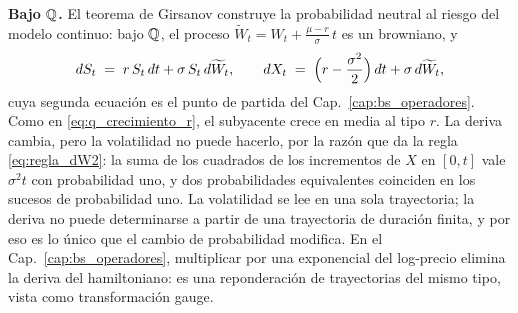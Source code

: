 \noindent\textbf{Bajo $\mathbb{Q}$.}
El teorema de Girsanov \cite[sec.~4.4]{tfgm} construye la probabilidad
neutral al riesgo del modelo continuo: bajo $\mathbb{Q}$, el proceso
$\widetilde W_t = W_t + \frac{\mu - r}{\sigma}\,t$ es un browniano, y
\begin{equation}\label{eq:bs_eds_Q}
  dS_t \;=\; r\, S_t\, dt + \sigma\, S_t\, d\widetilde W_t,
  \qquad
  dX_t \;=\; \Bigl(r - \frac{\sigma^2}{2}\Bigr)\, dt
  + \sigma\, d\widetilde W_t,
\end{equation}
cuya segunda ecuación es el punto de partida del
Cap.~\ref{cap:bs_operadores}\enprep. Como en \eqref{eq:q_crecimiento_r}, el
subyacente crece en media al tipo $r$. La deriva cambia, pero la
volatilidad no puede hacerlo, por la razón que da la regla
\eqref{eq:regla_dW2}: la suma de los cuadrados de los incrementos de $X$
en $[0, t]$ vale $\sigma^2 t$ con probabilidad uno, y dos probabilidades
equivalentes coinciden en los sucesos de probabilidad uno. La
volatilidad se lee en una sola trayectoria; la deriva no puede
determinarse a partir de una trayectoria de duración finita, y por eso
es lo único que el cambio de probabilidad modifica. En el
Cap.~\ref{cap:bs_operadores}\enprep, multiplicar por una exponencial del
log-precio elimina la deriva del hamiltoniano: es una reponderación de
trayectorias del mismo tipo, vista como transformación gauge.

